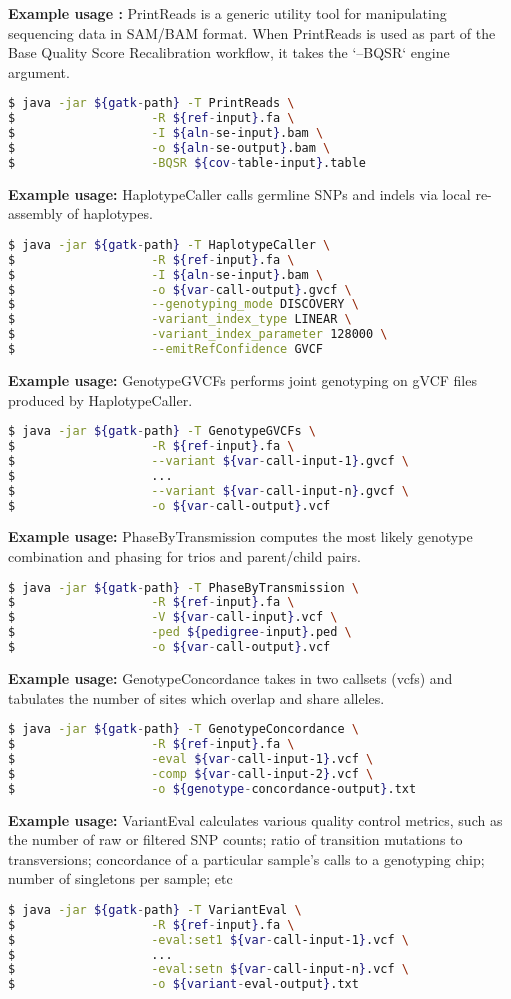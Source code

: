 \documentclass[8pt]{article}
\begin{document}
\textbf{Example usage :} PrintReads is a generic utility tool for manipulating sequencing data in SAM/BAM format. When PrintReads is used as part of the Base Quality Score Recalibration workflow, it takes the `--BQSR` engine argument.
\begin{lstlisting}[language=bash]
$ java -jar ${gatk-path} -T PrintReads \
$					-R ${ref-input}.fa \
$					-I ${aln-se-input}.bam \
$					-o ${aln-se-output}.bam \
$					-BQSR ${cov-table-input}.table
\end{lstlisting}
\textbf{Example usage:} HaplotypeCaller calls germline SNPs and indels via local re-assembly of haplotypes.
\begin{lstlisting}[language=bash]
$ java -jar ${gatk-path} -T HaplotypeCaller \
$					-R ${ref-input}.fa \
$					-I ${aln-se-input}.bam \
$					-o ${var-call-output}.gvcf \
$					--genotyping_mode DISCOVERY \
$					-variant_index_type LINEAR \
$					-variant_index_parameter 128000 \
$					--emitRefConfidence GVCF
\end{lstlisting}
\textbf{Example usage:} GenotypeGVCFs performs joint genotyping on gVCF files produced by HaplotypeCaller.
\begin{lstlisting}[language=bash]
$ java -jar ${gatk-path} -T GenotypeGVCFs \
$					-R ${ref-input}.fa \
$					--variant ${var-call-input-1}.gvcf \
$					...
$					--variant ${var-call-input-n}.gvcf \
$					-o ${var-call-output}.vcf
\end{lstlisting}

\newpage

\textbf{Example usage:} PhaseByTransmission computes the most likely genotype combination and phasing for trios and parent/child pairs.
\begin{lstlisting}[language=bash]
$ java -jar ${gatk-path} -T PhaseByTransmission \
$					-R ${ref-input}.fa \
$					-V ${var-call-input}.vcf \
$					-ped ${pedigree-input}.ped \
$					-o ${var-call-output}.vcf
\end{lstlisting}
\textbf{Example usage:} GenotypeConcordance takes in two callsets (vcfs) and tabulates the number of sites which overlap and share alleles.
\begin{lstlisting}[language=bash]
$ java -jar ${gatk-path} -T GenotypeConcordance \
$					-R ${ref-input}.fa \
$					-eval ${var-call-input-1}.vcf \
$					-comp ${var-call-input-2}.vcf \
$					-o ${genotype-concordance-output}.txt
\end{lstlisting}
\textbf{Example usage:} VariantEval calculates various quality control metrics, such as the number of raw or filtered SNP counts; ratio of transition mutations to transversions; concordance of a particular sample's calls to a genotyping chip; number of singletons per sample; etc
\begin{lstlisting}[language=bash]
$ java -jar ${gatk-path} -T VariantEval \
$					-R ${ref-input}.fa \
$					-eval:set1 ${var-call-input-1}.vcf \
$					...
$					-eval:setn ${var-call-input-n}.vcf \
$					-o ${variant-eval-output}.txt
\end{lstlisting}
\end{document}
